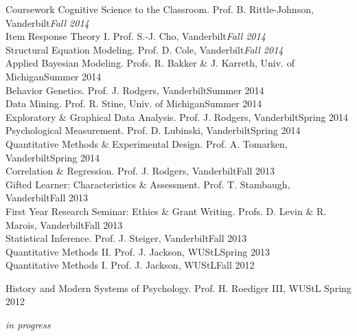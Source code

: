 \documentclass {resume}
\begin{document}
\begin{rSection}{\textrm{Coursework}}
Cognitive Science to the Classroom. Prof. B. Rittle-Johnson, Vanderbilt\hfill  {\textit{Fall 2014}}\smallskip\\
Item Response Theory \textrm{I}. Prof. S.-J. Cho, Vanderbilt\hfill  {\textit{Fall 2014}}\smallskip\\
Structural Equation Modeling. Prof. D. Cole, Vanderbilt\hfill  {\textit{Fall 2014}}\smallskip\\%
Applied Bayesian Modeling. Profs. R. Bakker \& J. Karreth, Univ. of Michigan\hfill  {Summer 2014}\smallskip\\
Behavior Genetics. Prof. J. Rodgers, Vanderbilt\hfill  {Summer 2014}\smallskip\\
Data Mining. Prof. R. Stine, Univ. of Michigan\hfill  {Summer 2014}\smallskip\\
Exploratory \& Graphical Data Analysis. Prof. J. Rodgers, Vanderbilt\hfill  {Spring 2014}\smallskip\\
Psychological Measurement. Prof. D. Lubinski, Vanderbilt\hfill  {Spring 2014}\smallskip\\
Quantitative Methods \& Experimental Design. Prof. A. Tomarken, Vanderbilt\hfill  {Spring 2014}\smallskip\\
Correlation \& Regression. Prof. J. Rodgers, Vanderbilt\hfill  {Fall 2013}\smallskip\\
Gifted Learner: Characteristics \& Assessment. Prof. T. Stambaugh, Vanderbilt\hfill  {Fall 2013}\smallskip\\
First Year Research Seminar: Ethics \& Grant Writing. Profs. D. Levin \& R. Marois, Vanderbilt\hfill  {Fall 2013}\smallskip\\
Statistical Inference. Prof. J. Steiger, Vanderbilt\hfill  {Fall 2013}\smallskip\\
Quantitative Methods \textrm{II}. Prof. J. Jackson, WUStL\hfill  {Spring 2013}\smallskip\\
Quantitative Methods \textrm{I}. Prof. J. Jackson, WUStL\hfill  {Fall 2012}\smallskip\\
\begin{samepage}History and Modern Systems of Psychology. Prof. H. Roediger \textrm{III}, WUStL \hfill  {Spring 2012}\vspace{-2mm}\begin{center}\footnotesize{ %
\textit{in progress}
}\end{center} \vspace{-4mm}\end{samepage}
\end{rSection}
\end{document}
